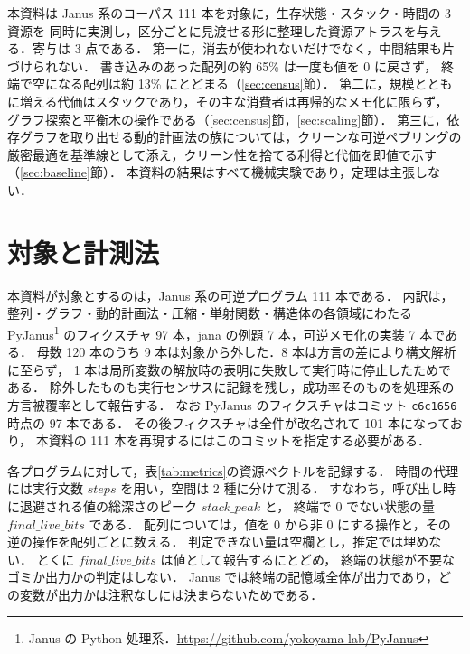 \documentclass[a4paper,11pt]{jsarticle}
\begin{document}
本資料は Janus 系のコーパス 111 本を対象に，生存状態・スタック・時間の 3 資源を
同時に実測し，区分ごとに見渡せる形に整理した資源アトラスを与える．寄与は 3 点である．
第一に，消去が使われないだけでなく，中間結果も片づけられない．
書き込みのあった配列の約 65\% は一度も値を 0 に戻さず，
終端で空になる配列は約 13\% にとどまる（\ref{sec:census}節）．
第二に，規模とともに増える代価はスタックであり，その主な消費者は再帰的なメモ化に限らず，
グラフ探索と平衡木の操作である（\ref{sec:census}節，\ref{sec:scaling}節）．
第三に，依存グラフを取り出せる動的計画法の族については，クリーンな可逆ペブリングの
厳密最適を基準線として添え，クリーン性を捨てる利得と代価を即値で示す（\ref{sec:baseline}節）．
本資料の結果はすべて機械実験であり，定理は主張しない．

\section{対象と計測法}\label{sec:method}

本資料が対象とするのは，Janus 系の可逆プログラム 111 本である\cite{LRR82:janus}．
内訳は，整列・グラフ・動的計画法・圧縮・単射関数・構造体の各領域にわたる
PyJanus\footnote{Janus の Python 処理系．\url{https://github.com/yokoyama-lab/PyJanus}}
のフィクスチャ 97 本，jana の例題 7 本，可逆メモ化の実装 7 本である\cite{Yoko17}．
母数 120 本のうち 9 本は対象から外した．8 本は方言の差により構文解析に至らず，
1 本は局所変数の解放時の表明に失敗して実行時に停止したためである．
除外したものも実行センサスに記録を残し，成功率そのものを処理系の方言被覆率として報告する．
なお PyJanus のフィクスチャはコミット \texttt{c6c1656} 時点の 97 本である．
その後フィクスチャは全件が改名されて 101 本になっており，
本資料の 111 本を再現するにはこのコミットを指定する必要がある．

各プログラムに対して，表\ref{tab:metrics}の資源ベクトルを記録する．
時間の代理には実行文数 $\mathit{steps}$ を用い，空間は 2 種に分けて測る．
すなわち，呼び出し時に退避される値の総深さのピーク $\mathit{stack\_peak}$ と，
終端で 0 でない状態の量 $\mathit{final\_live\_bits}$ である．
配列については，値を 0 から非 0 にする操作と，その逆の操作を配列ごとに数える．
判定できない量は空欄とし，推定では埋めない．
とくに $\mathit{final\_live\_bits}$ は値として報告するにとどめ，
終端の状態が不要なゴミか出力かの判定はしない．
Janus では終端の記憶域全体が出力であり，どの変数が出力かは注釈なしには決まらないためである．
\end{document}
